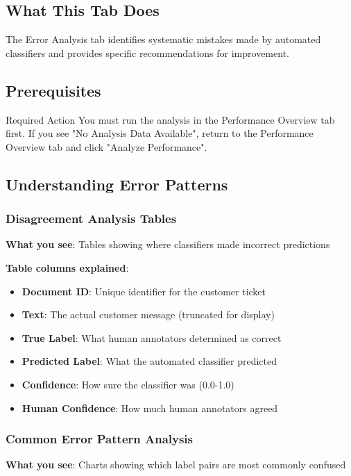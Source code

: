 \documentclass[11pt,a4paper]{article}
\begin{document}
\subsection{What This Tab Does}
The Error Analysis tab identifies systematic mistakes made by automated classifiers and provides specific recommendations for improvement.

\subsection{Prerequisites}
\begin{infobox}{Required Action}
You must run the analysis in the Performance Overview tab first. If you see "No Analysis Data Available", return to the Performance Overview tab and click "Analyze Performance".
\end{infobox}

\subsection{Understanding Error Patterns}

\subsubsection{Disagreement Analysis Tables}
\textbf{What you see}: Tables showing where classifiers made incorrect predictions

\textbf{Table columns explained}:
\begin{itemize}
    \item \textbf{Document ID}: Unique identifier for the customer ticket
    \item \textbf{Text}: The actual customer message (truncated for display)
    \item \textbf{True Label}: What human annotators determined as correct
    \item \textbf{Predicted Label}: What the automated classifier predicted
    \item \textbf{Confidence}: How sure the classifier was (0.0-1.0)
    \item \textbf{Human Confidence}: How much human annotators agreed
\end{itemize}

\subsubsection{Common Error Pattern Analysis}
\textbf{What you see}: Charts showing which label pairs are most commonly confused
\end{document}
